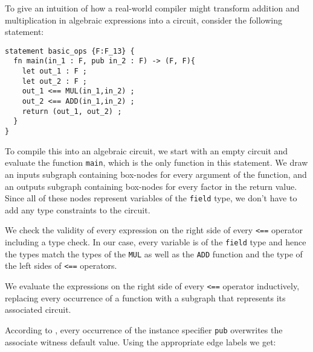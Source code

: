\begin{example} To give an intuition of how a real-world compiler might transform addition and multiplication in algebraic expressions into a circuit, consider the following  statement:
\begin{lstlisting}
statement basic_ops {F:F_13} {
  fn main(in_1 : F, pub in_2 : F) -> (F, F){
  	let out_1 : F ;
	let out_2 : F ;
    out_1 <== MUL(in_1,in_2) ;
    out_2 <== ADD(in_1,in_2) ;
    return (out_1, out_2) ;
  }
}
\end{lstlisting} 
To compile this into an algebraic circuit, we start with an empty circuit and evaluate the function \texttt{main}, which is the only function in this statement. We draw an inputs subgraph containing box-nodes for every argument of the function, and an outputs subgraph containing box-nodes for every factor in the return value. Since all of these nodes represent variables of the \texttt{field} type, we don't have to add any type constraints to the circuit.

We check the validity of every expression on the right side of every \texttt{<==} operator including a type check. In our case, every variable is of the \texttt{field} type and hence the types match the types of the \texttt{MUL} as well as the \texttt{ADD} function and the type of the left sides of \texttt{<==} operators. 

We evaluate the expressions on the right side of every \texttt{<==} operator inductively, replacing every occurrence of a function with a subgraph that represents its associated circuit.

According to , every occurrence of the instance specifier \texttt{pub} overwrites the associate witness default value. Using the appropriate edge labels we get: 
\begin{center}
\end{center}
\end{example}
